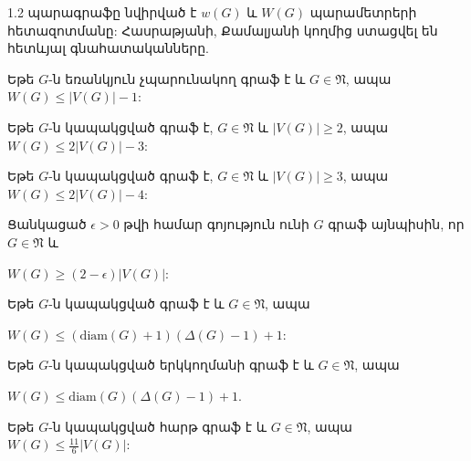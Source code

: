 1.2 պարագրաֆը նվիրված է $w(G)$ և $W(G)$ պարամետրերի հետազոտմանը: Հասրաթյանի, Քամալյանի կողմից ստացվել են հետևյալ գնահատականները.
\begin{theorem}
\label{t1_upper_notriangle} Եթե $G$-ն եռանկյուն չպարունակող գրաֆ է և $G\in \mathfrak{N}$, ապա $W(G)\leq \vert V(G)\vert -1$:
\end{theorem}

\begin{hide}
\begin{theorem}
\label{t1_upper_2V-3} \cite{Kamalian1990}
Եթե $G$-ն կապակցված գրաֆ է, $G\in \mathfrak{N}$ և $|V(G)|\geq 2$, ապա
$W(G)\leq 2|V(G)|-3$:
\end{theorem}

\begin{theorem}
\label{t1_upper_2V-4} \cite{GiaroKubaleMalafiejski2001}
Եթե $G$-ն կապակցված գրաֆ է, $G\in \mathfrak{N}$ և $|V(G)|\geq 3$, ապա
$W(G)\leq 2|V(G)|-4$:
\end{theorem} 
\begin{theorem}
Ցանկացած $\epsilon > 0$ թվի համար գոյություն ունի $G$ գրաֆ այնպիսին, որ $G \in \mathfrak{N}$ և
\begin{center}
$W(G) \geq (2-\epsilon)|V(G)|$:
\end{center}
\end{theorem}
\end{hide}

\begin{hide}
\begin{theorem} \cite{AsratianKamalian1994}
\label{t1_upper} Եթե $G$-ն կապակցված գրաֆ է և $G\in \mathfrak{N}$, ապա
\begin{center}
$W(G)\leq \left(\mathrm{diam}(G)+1\right)\left(\Delta(G) -1\right) + 1$:
\end{center}
\end{theorem}

\begin{theorem}\cite{AsratianKamalian1994}
\label{t1_upper_bipartite} Եթե $G$-ն կապակցված երկկողմանի գրաֆ է և $G\in
\mathfrak{N}$, ապա
\begin{center}
$W(G)\leq \mathrm{diam}(G)\left(\Delta(G) -1\right) +1$.
\end{center}
\end{theorem} %

\begin{theorem}
\label{t1_axenovich}
Եթե $G$-ն կապակցված հարթ գրաֆ է և $G \in \mathfrak{N}$, ապա $W(G) \leq \frac{11}{6}|V(G)|$:
\end{theorem}
\end{hide}

